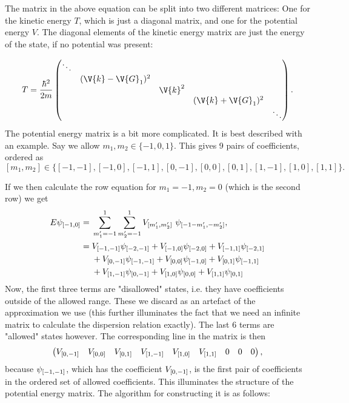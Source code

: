 \documentclass[main.tex]{subfiles}
\begin{document}
	The matrix in the above equation can be split into two different matrices: One for the kinetic energy $ T $, which is just a diagonal matrix, and one for the potential energy $ V $. The diagonal elements of the kinetic energy matrix are just the energy of the state, if no potential was present:
	
	\begin{equation}\label{key}
		T = \frac{\hbar^2}{2m} \begin{pmatrix}
			\ddots	& 		 			&			& 					& \\
					& (\V{k}-\V{G}_1)^2	& 			& 					& \\
					& 	 				& \V{k}^2	& 					& \\
					&					&			& (\V{k}+\V{G}_1)^2	& \\
					&					&			&					& \ddots
		\end{pmatrix}.
	\end{equation}
	The potential energy matrix is a bit more complicated. It is best described with an example. Say we allow $ m_1, m_2 \in \{-1,0,1\} $. This gives 9 pairs of coefficients, ordered as
	\begin{equation}\label{key}
		[m_1, m_2] \in \{ [-1, -1], [-1, 0], [-1, 1], [0, -1], [0, 0], [0, 1], [1,-1], [1, 0], [1,1]  \}.
	\end{equation}
	
	If we then calculate the row equation for $ m_1 = -1, m_2 = 0 $ (which is the second row) we get
	\begin{align*}
		E \psi_{[-1,0]} = {} & \sum_{m'_1 =  -1}^{1}\sum_{m'_2 = -1}^{1} V_{[m'_1, m'_2]} \ \psi_{[-1-m'_1, -m'_2]}, \\
		= {} & V_{[-1, -1]} \psi_{[-2, -1]} + V_{[-1, 0]} \psi_{[-2, 0]} + V_{[-1, 1]} \psi_{[-2, 1]} \\
		& + V_{[0, -1]} \psi_{[-1, -1]} + V_{[0, 0]} \psi_{[-1, 0]} + V_{[0, 1]}\psi_{[-1, 1]} \\
		&+ V_{[1, -1]} \psi _{[0,-1]} + V_{[1, 0]} \psi _{[0, 0]} + V_{[1,1]} \psi _{[0, 1]}
	\end{align*}
	Now, the first three terms are "disallowed" states, i.e. they have coefficients outside of the allowed range. These we discard as an artefact of the approximation we use (this further illuminates the fact that we need an infinite matrix to calculate the dispersion relation exactly). The last 6 terms are "allowed" states however. The corresponding line in the matrix is then
	\begin{equation}
		\begin{pmatrix}
			V_{[0, -1]} &  V_{[0, 0]} & V_{[0, 1]} & V_{[1, -1]} & V_{[1, 0]} & V_{[1,1]} & 0 & 0 & 0 
		\end{pmatrix},
	\end{equation}
	because $ \psi_{[-1,-1]} $, which has the coefficient $ V_{[0, -1]} $, is the first pair of coefficients in the ordered set of allowed coefficients. This illuminates the structure of the potential energy matrix. The algorithm for constructing it is as follows:
	
\end{document}
